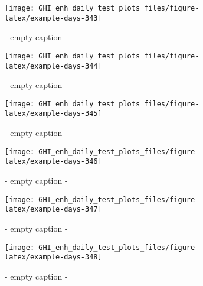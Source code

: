 \documentclass[
  10pt,
  a4paper,oneside]{article}
\begin{document}
\begin{figure}[H]

{\centering \texttt{[image: GHI\_enh\_daily\_test\_plots\_files/figure-latex/example-days-343]} 

}

\caption{ - empty caption - }\label{fig:example-days-343}
\end{figure}

\begin{figure}[H]

{\centering \texttt{[image: GHI\_enh\_daily\_test\_plots\_files/figure-latex/example-days-344]} 

}

\caption{ - empty caption - }\label{fig:example-days-344}
\end{figure}

\begin{figure}[H]

{\centering \texttt{[image: GHI\_enh\_daily\_test\_plots\_files/figure-latex/example-days-345]} 

}

\caption{ - empty caption - }\label{fig:example-days-345}
\end{figure}

\begin{figure}[H]

{\centering \texttt{[image: GHI\_enh\_daily\_test\_plots\_files/figure-latex/example-days-346]} 

}

\caption{ - empty caption - }\label{fig:example-days-346}
\end{figure}

\begin{figure}[H]

{\centering \texttt{[image: GHI\_enh\_daily\_test\_plots\_files/figure-latex/example-days-347]} 

}

\caption{ - empty caption - }\label{fig:example-days-347}
\end{figure}

\begin{figure}[H]

{\centering \texttt{[image: GHI\_enh\_daily\_test\_plots\_files/figure-latex/example-days-348]} 

}

\caption{ - empty caption - }\label{fig:example-days-348}
\end{figure}
\end{document}
